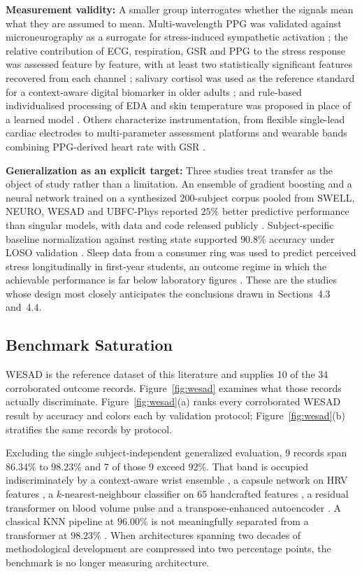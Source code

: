 \textbf{Measurement validity:} A smaller group interrogates whether the signals mean what they
are assumed to mean. Multi-wavelength PPG was validated against microneurography as a
surrogate for stress-induced sympathetic activation \cite{r86}; the relative contribution of
ECG, respiration, GSR and PPG to the stress response was assessed feature by feature, with at
least two statistically significant features recovered from each channel \cite{r29}; salivary
cortisol was used as the reference standard for a context-aware digital biomarker in older
adults \cite{r73}; and rule-based individualised processing of EDA and skin temperature was
proposed in place of a learned model \cite{r48}. Others characterize instrumentation, from
flexible single-lead cardiac electrodes \cite{r76} to multi-parameter assessment platforms
\cite{r41} and wearable bands combining PPG-derived heart rate with GSR \cite{r24}.

\textbf{Generalization as an explicit target:} Three studies treat transfer as the object of
study rather than a limitation. An ensemble of gradient boosting and a neural network trained
on a synthesized 200-subject corpus pooled from SWELL, NEURO, WESAD and UBFC-Phys reported
$25\%$ better predictive performance than singular models, with data and code released
publicly \cite{r101}. Subject-specific baseline normalization against resting state supported
$90.8\%$ accuracy under LOSO validation \cite{r21}. Sleep data from a consumer ring was used
to predict perceived stress longitudinally in first-year students, an outcome regime in which
the achievable performance is far below laboratory figures \cite{r102}. These are the studies
whose design most closely anticipates the conclusions drawn in Sections~4.3 and~4.4.

\subsection{Benchmark Saturation}
WESAD is the reference dataset of this literature and supplies 10 of the 34 corroborated
outcome records. Figure~\ref{fig:wesad} examines what those records actually discriminate.
Figure~\ref{fig:wesad}(a) ranks every corroborated WESAD result by accuracy and colors each
by validation protocol; Figure~\ref{fig:wesad}(b) stratifies the same records by protocol.

Excluding the single subject-independent generalized evaluation, 9 records span
$86.34\%$ to $98.23\%$ and 7 of those 9 exceed $92\%$. That band is occupied indiscriminately
by a context-aware wrist ensemble \cite{r58}, a capsule network on HRV features \cite{r61}, a
$k$-nearest-neighbour classifier on 65 handcrafted features \cite{r14}, a residual
transformer on blood volume pulse \cite{r50} and a transpose-enhanced autoencoder \cite{r55}.
A classical KNN pipeline at $96.00\%$ \cite{r14} is not meaningfully separated from a
transformer at $98.23\%$ \cite{r50}. When architectures spanning two decades of methodological
development are compressed into two percentage points, the benchmark is no longer measuring
architecture.

